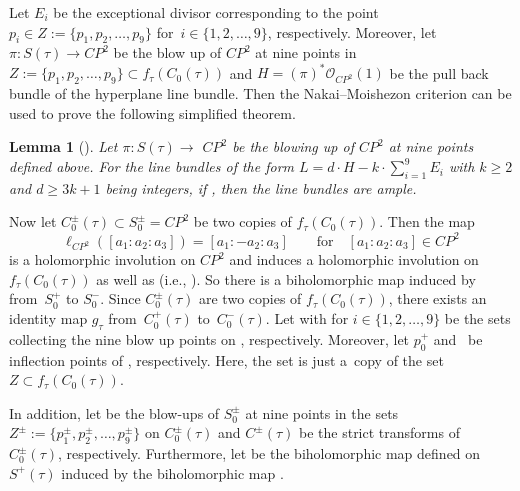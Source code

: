 \documentclass[10pt,a4paper]{amsart}
\numberwithin{equation}{section}
\newtheorem{Lemma}[Theorem]{Lemma}
\def\operatorname#1{#1}
\def\overline#1{#1}
\begin{document}
Let $E_i$ be the exceptional divisor corresponding to the point $p_i \in Z:= \{p_1, p_2, \dots , p_9 \}$ for~${i \in \{1, 2, \dots , 9 \}}$, respectively. Moreover, let $\pi\colon S(\tau)\rightarrow \operatorname{CP}^2$ be the blow up of $\operatorname{CP}^2$ at nine points in $Z:= \{p_1, p_2, \dots , p_9 \}\subset f_{\tau}(C_0(\tau))$ and $H=(\pi)^* \mathcal{O}_{\operatorname{CP}^2}(1)$ be the pull back bundle of the hyperplane line bundle. Then the Nakai--Moishezon criterion \cite[Appendix~A]{Robin} can be used to prove the following simplified theorem.

\begin{Lemma}[{\cite[Theorem~3]{Tomasz-Halszka}}] \label{Lemma2.5}
Let $\pi\colon S(\tau)\rightarrow$ \emph{$\operatorname{CP}^2$} be the blowing up of \emph{$\operatorname{CP}^2$} at nine points defined above. For the line bundles of the form $L=d\cdot H-k\cdot\sum _{i=1}^9 E_i$ with $k\geq2$ and $d\geq3k+1$ being integers, if , then the line bundles are ample.
\end{Lemma}

Now let $C^{\pm}_0(\tau) \subset S^{\pm}_0=\operatorname{CP}^2 $ be two copies of $f_{\tau}(C_0(\tau))$. Then the map
\[\ell_{\operatorname{CP}^2}([a_1:a_2:a_3])=[a_1:-a_2:a_3] \qquad \text{for} \quad [a_1:a_2:a_3]\in \operatorname{CP}^2\]
is a holomorphic involution on $\operatorname{CP}^2$ and induces a holomorphic involution on $f_{\tau}(C_0(\tau))$ as well as  (i.e., \smash{$(\ell_{\operatorname{CP}^2})^{-1}=\ell_{\operatorname{CP}^2}$}). So there is a biholomorphic map  induced by \smash{$\ell_{\operatorname{CP}^2}$} from~$S^{+}_0$ to $S^{-}_0$. Since $C^\pm_0(\tau)$ are two copies of $f_{\tau}(C_0(\tau))$, there exists an identity map $g_\tau$ from~$C_0^{+}(\tau)$ to~$C_0^{-}(\tau)$. Let  with  for $i \in \{1, 2, \dots , 9 \}$ be the sets collecting the nine blow up points on , respectively. Moreover, let $p^{+}_0$ and~ be inflection points of , respectively. Here, the set  is just a~copy of the set~$Z \subset f_{\tau}(C_0(\tau))$.

In addition, let \smash{$S^{\pm}(\tau)\cong\operatorname{CP}^2 \#9\overline{\operatorname{CP}}^2$} be the blow-ups of $S^{\pm}_0$ at nine points in the sets $Z^{\pm}:=\bigl\{p^{\pm}_1, p^{\pm}_2, \dots , p^{\pm}_9\bigr\}$ on $C_0^{\pm}(\tau)$ and $C^{\pm}(\tau)$ be the strict transforms of $C_0^{\pm}(\tau)$, respectively. Furthermore, let  be the biholomorphic map defined on $S^{+}(\tau)$ induced by the biholomorphic map .
\end{document}
